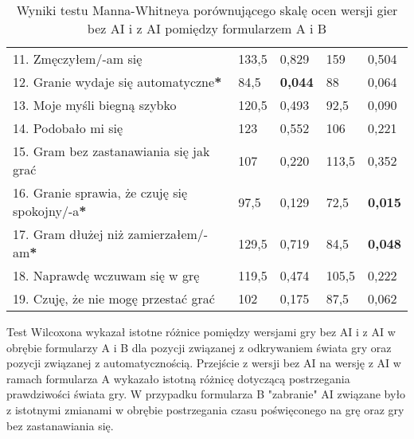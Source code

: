 \begin{table}[h!]
\begin{center}
\begin{tabular}{|m{10em}|m{5em}|m{5em}|m{5em}|m{5em}|}
            11. Zmęczyłem/-am się                                             & 133,5                       & 0,829            & 159                     & 0,504          \\
            12. Granie wydaje się automatyczne\textbf{*}                      & 84,5                        & \textbf{0,044}   & 88                      & 0,064          \\
            13. Moje myśli \newline biegną szybko                             & 120,5                       & 0,493            & 92,5                    & 0,090          \\
            14. Podobało mi się                                               & 123                         & 0,552            & 106                     & 0,221          \\
            15. Gram bez zastanawiania się jak grać                           & 107                         & 0,220            & 113,5                   & 0,352          \\
            16. Granie sprawia, \newline że czuję się spokojny/-a\textbf{*}   & 97,5                        & 0,129            & 72,5                    & \textbf{0,015} \\
            17. Gram dłużej \newline niż zamierzałem/-am\textbf{*}            & 129,5                       & 0,719            & 84,5                    & \textbf{0,048} \\
            18. Naprawdę wczuwam się w grę                                    & 119,5                       & 0,474            & 105,5                   & 0,222          \\
            19. Czuję, że nie mogę przestać grać                              & 102                         & 0,175            & 87,5                    & 0,062          \\
            \hline
        \end{tabular}
    \end{center}
    \caption{Wyniki testu Manna-Whitneya porównującego skalę ocen wersji gier bez AI i z AI pomiędzy formularzem A i B}\label{tab1:ch7_14}
\end{table}

\newpage

Test Wilcoxona wykazał istotne różnice pomiędzy wersjami gry bez AI i z AI w obrębie formularzy A i B
dla pozycji związanej z odkrywaniem świata gry oraz pozycji związanej z automatycznością. Przejście z
wersji bez AI na wersję z AI w ramach formularza A wykazało istotną różnicę dotyczącą postrzegania
prawdziwości świata gry. W przypadku formularza B "zabranie" AI związane było z istotnymi zmianami
w obrębie postrzegania czasu poświęconego na grę oraz gry bez zastanawiania się.

